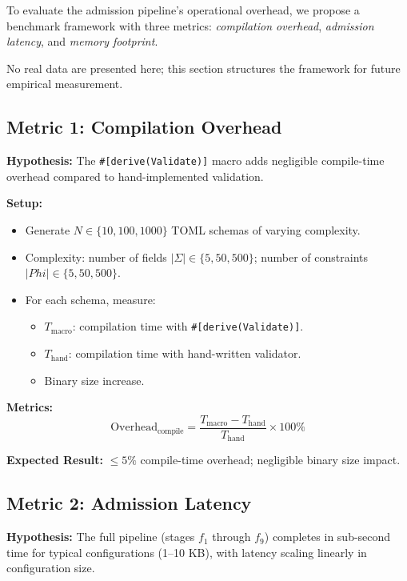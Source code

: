 To evaluate the admission pipeline's operational overhead, we propose a
benchmark framework with three metrics: \emph{compilation overhead},
\emph{admission latency}, and \emph{memory footprint}.

No real data are presented here; this section structures the framework
for future empirical measurement.

\subsection{Metric 1: Compilation Overhead}

\textbf{Hypothesis:} The \texttt{\#[derive(Validate)]} macro adds negligible
compile-time overhead compared to hand-implemented validation.

\textbf{Setup:}
\begin{itemize}
  \item Generate $N \in \{10, 100, 1000\}$ TOML schemas of varying complexity.
  \item Complexity: number of fields $|\Sigma| \in \{5, 50, 500\}$;
        number of constraints $|Phi| \in \{5, 50, 500\}$.
  \item For each schema, measure:
    \begin{itemize}
      \item $T_{\mathrm{macro}}$: compilation time with \texttt{\#[derive(Validate)]}.
      \item $T_{\mathrm{hand}}$: compilation time with hand-written validator.
      \item Binary size increase.
    \end{itemize}
\end{itemize}

\textbf{Metrics:}
\[
  \mathrm{Overhead}_{\mathrm{compile}} = \frac{T_{\mathrm{macro}} - T_{\mathrm{hand}}}{T_{\mathrm{hand}}} \times 100\%
\]

\textbf{Expected Result:} $\leq 5\%$ compile-time overhead; negligible binary size impact.

\subsection{Metric 2: Admission Latency}

\textbf{Hypothesis:} The full pipeline (stages $f_1$ through $f_9$) completes
in sub-second time for typical configurations (1--10 KB), with latency
scaling linearly in configuration size.

